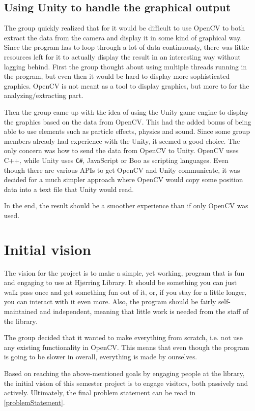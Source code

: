 \subsection{Using Unity to handle the graphical output}
The group quickly realized that for it would be difficult to use OpenCV to both extract the data from the camera and display it in some kind of graphical way. Since the program has to loop through a lot of data continuously, there was little resources left for it to actually display the result in an interesting way without lagging behind. First the group thought about using multiple threads running in the program, but even then it would be hard to display more sophisticated graphics. OpenCV is not meant as a tool to display graphics, but more to for the analyzing/extracting part.

Then the group came up with the idea of using the Unity game engine to display the graphics based on the data from OpenCV. This had the added bonus of being able to use elements such as particle effects, physics and sound. Since some group members already had experience with the Unity, it seemed a good choice. The only concern was how to send the data from OpenCV to Unity. OpenCV uses C++, while Unity uses \texttt{C\#}, JavaScript or Boo as scripting languages. Even though there are various APIs to get OpenCV and Unity communicate, it was decided for a much simpler approach where OpenCV would copy some position data into a text file that Unity would read.

In the end, the result should be a smoother experience than if only OpenCV was used.
  
\section{Initial vision}
The vision for the project is to make a simple, yet working, program that is fun and engaging to use at Hj{\o}rring Library. It should be something you can just walk pass once and get something fun out of it, or, if you stay for a little longer, you can interact with it even more. Also, the program should be fairly self-maintained and independent, meaning that little work is needed from the staff of the library.

The group decided that it wanted to make everything from scratch, i.e. not use any existing functionality in OpenCV. This means that even though the program is going to be slower in overall, everything is made by ourselves.

Based on reaching the above-mentioned goals by engaging people at the library, the initial vision of this semester project is to engage visitors, both passively and actively. Ultimately, the final problem statement can be read in \ref{problemStatement}.